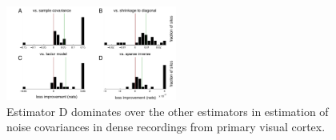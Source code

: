 \begin{figure}[htp]
\centering
\includegraphics[width=0.5\textwidth]{figures/Figure4.pdf}
\caption{Estimator D dominates over the other estimators in estimation of noise covariances in dense recordings from primary visual cortex.
}\label{fig:04}
\end{figure}
